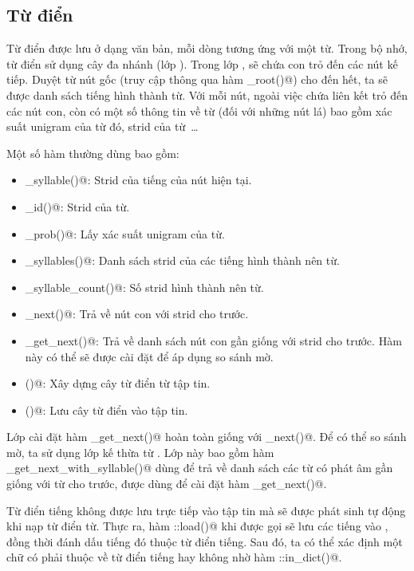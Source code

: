 \documentclass[a4paper,oneside,14pt]{extbook} %
\begin{document}
\subsection{Từ điển}

Từ điển được lưu ở dạng văn bản, mỗi dòng tương ứng với một từ. Trong
bộ nhớ, từ điển sử dụng cây đa nhánh (lớp \verb@WordNode@). Trong lớp
\verb@WordNode@, \verb@nodes@ sẽ chứa con trỏ đến các nút kế tiếp. Duyệt
từ nút gốc (truy cập thông qua hàm \verb@get_root()@) cho đến hết, ta
sẽ được danh sách tiếng hình thành từ. Với mỗi nút, ngoài việc chứa
liên kết trỏ đến các nút con, còn có một số thông tin về từ (đối với
những nút lá) bao gồm xác suất uni\-gram của từ đó, strid của từ~\ldots

Một số hàm thường dùng bao gồm:
\begin{itemize}
\item \verb@get_syllable()@: Strid của tiếng của nút hiện tại.
\item \verb@get_id()@: Strid của từ.
\item \verb@get_prob()@: Lấy xác suất uni\-gram của từ.
\item \verb@get_syllables()@: Danh sách strid của các tiếng hình thành
  nên từ.
\item \verb@get_syllable_count()@: Số strid hình thành nên từ.
\item \verb@get_next()@: Trả về nút con với strid cho trước.
\item \verb@fuzzy_get_next()@: Trả về danh sách nút con gần giống với
  strid cho trước. Hàm này có thể sẽ được cài đặt để áp dụng so sánh
  mờ.
\item \verb@load()@: Xây dựng cây từ điển từ tập tin.
\item \verb@save()@: Lưu cây từ điển vào tập tin.
\end{itemize}

Lớp \verb@WordNode@ cài đặt hàm \verb@fuzzy_get_next()@ hoàn toàn giống
với \verb@get_next()@. Để có thể so sánh mờ, ta sử dụng lớp
\verb@FuzzyWordNode@ kế thừa từ \verb@WordNode@. Lớp này bao gồm hàm
\verb@fuzzy_get_next_with_syllable()@ dùng để trả về danh sách các từ có
phát âm gần giống với từ cho trước, được dùng để cài đặt hàm \verb@fuzzy_get_next()@.

Từ điển tiếng không được lưu trực tiếp vào tập tin mà sẽ được phát
sinh tự động khi nạp từ điển từ. Thực ra, hàm \verb@WordNode::load()@
khi được gọi sẽ lưu các tiếng vào \verb@StringArchive@, đồng thời đánh
dấu tiếng đó thuộc từ điển tiếng. Sau đó, ta có thể xác định một chữ
có phải thuộc về từ điển tiếng hay không nhờ hàm
\verb@StringArchive::in_dict()@.
\end{document}
